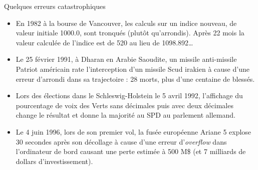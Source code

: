 \documentclass[10pt]{beamer}
\begin{document}
\begin{frame}{Quelques erreurs catastrophiques}
  \begin{itemize}
  \item En 1982  à la bourse de Vancouver, les calculs sur un indice nouveau, de valeur initiale 1000.0, sont tronqués (plutôt qu’arrondis). Après 22 mois la valeur calculée de l’indice est de 520 au lieu de 1098.892\dots
  \item Le 25 février 1991, à Dharan en Arabie Saoudite, un missile anti-missile Patriot américain rate l’interception d’un missile Scud irakien à cause d'une erreur d'arrondi dans sa trajectoire : 28 morts, plus d’une centaine de blessés.
  \item Lors des élections dans le Schleswig-Holstein le 5 avril 1992, l’affichage du pourcentage de voix des Verts sans décimales puis avec deux décimales change le résultat et donne la majorité au SPD au parlement allemand.
  \item Le 4 juin 1996, lors de son premier vol, la fusée européenne Ariane 5 explose 30 secondes après son décollage à cause d'une erreur d'\textit{overflow} dans l'ordinateur de bord causant une perte estimée à 500 M\$ (et 7 milliards de dollars d’investissement).
  \end{itemize}
\end{frame}
\end{document}

